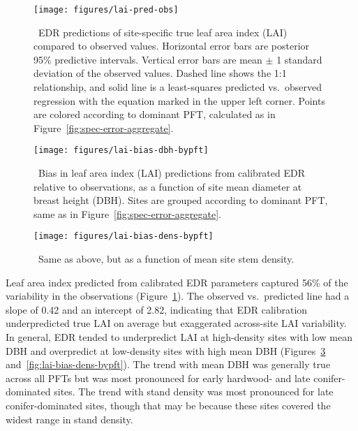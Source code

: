 \begin{figure}
  \centering
  \texttt{[image: figures/lai-pred-obs]}
  \caption{\
    EDR predictions of site-specific true leaf area index (LAI) compared to observed values.
    Horizontal error bars are posterior 95\% predictive intervals.
    Vertical error bars are mean $\pm$ 1 standard deviation of the observed values.
    Dashed line shows the 1:1 relationship, and solid line is a least-squares predicted vs.\ observed regression with the equation marked in the upper left corner.
    Points are colored according to dominant PFT, calculated as in Figure~\ref{fig:spec-error-aggregate}.
  }\label{fig:lai-pred-obs}
\end{figure}

\begin{figure}
  \centering
  \texttt{[image: figures/lai-bias-dbh-bypft]}
  \caption{\
    Bias in leaf area index (LAI) predictions from calibrated EDR relative to observations,
    as a function of site mean diameter at breast height (DBH).
    Sites are grouped according to dominant PFT, same as in Figure~\ref{fig:spec-error-aggregate}.
  }\label{fig:lai-bias-dbh-bypft}
\end{figure}

\begin{figure}
  \centering
  \texttt{[image: figures/lai-bias-dens-bypft]}
  \caption{\
    Same as above, but as a function of mean site stem density.
  }\label{fig:lai-bias-dbh-bypft}
\end{figure}

Leaf area index predicted from calibrated EDR parameters captured 56\% of the variability in the observations (Figure~\ref{fig:lai-pred-obs}).
The observed vs.\ predicted line had a slope of 0.42 and an intercept of 2.82, indicating that EDR calibration underpredicted true LAI on average but exaggerated across-site LAI variability.
In general, EDR tended to underpredict LAI at high-density sites with low mean DBH and overpredict at low-density sites with high mean DBH (Figures~\ref{fig:lai-bias-dbh-bypft} and~\ref{fig:lai-bias-dens-bypft}).
The trend with mean DBH was generally true across all PFTs but was most pronounced for early hardwood- and late conifer-dominated sites.
The trend with stand density was most pronounced for late conifer-dominated sites, though that may be because these sites covered the widest range in stand density.

